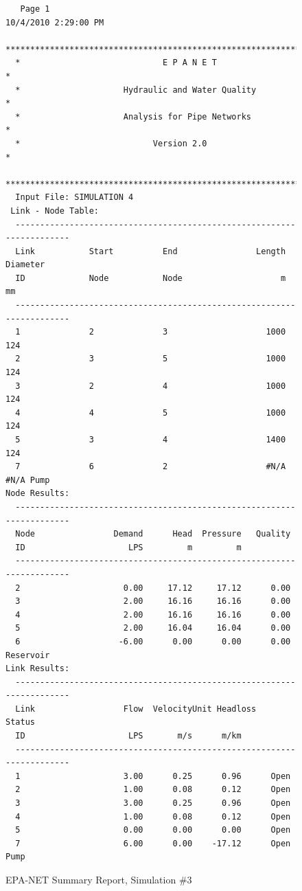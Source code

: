 \documentclass[11pt]{article}
\begin{document}
\begin{enumerate}
\begin{figure}[ht!] %
\centering

\begin{verbatim}
   Page 1                                            10/4/2010 2:29:00 PM
  **********************************************************************
  *                             E P A N E T                            *
  *                     Hydraulic and Water Quality                    *
  *                     Analysis for Pipe Networks                     *
  *                           Version 2.0                              *
  **********************************************************************
  Input File: SIMULATION 4
 Link - Node Table:
  ----------------------------------------------------------------------
  Link           Start          End                Length  Diameter
  ID             Node           Node                    m        mm
  ----------------------------------------------------------------------
  1              2              3                    1000       124
  2              3              5                    1000       124
  3              2              4                    1000       124
  4              4              5                    1000       124
  5              3              4                    1400       124
  7              6              2                    #N/A      #N/A Pump
Node Results:
  ----------------------------------------------------------------------
  Node                Demand      Head  Pressure   Quality
  ID                     LPS         m         m          
  ----------------------------------------------------------------------
  2                     0.00     17.12     17.12      0.00
  3                     2.00     16.16     16.16      0.00
  4                     2.00     16.16     16.16      0.00
  5                     2.00     16.04     16.04      0.00
  6                    -6.00      0.00      0.00      0.00 Reservoir
Link Results:
  ----------------------------------------------------------------------
  Link                  Flow  VelocityUnit Headloss    Status
  ID                     LPS       m/s      m/km
  ----------------------------------------------------------------------
  1                     3.00      0.25      0.96      Open
  2                     1.00      0.08      0.12      Open
  3                     3.00      0.25      0.96      Open
  4                     1.00      0.08      0.12      Open
  5                     0.00      0.00      0.00      Open
  7                     6.00      0.00    -17.12      Open Pump
  \end{verbatim}
     \caption{EPA-NET Summary Report, Simulation \#3}
   \label{fig:epanet3} 
\end{figure}


\end{enumerate}
\end{document}
